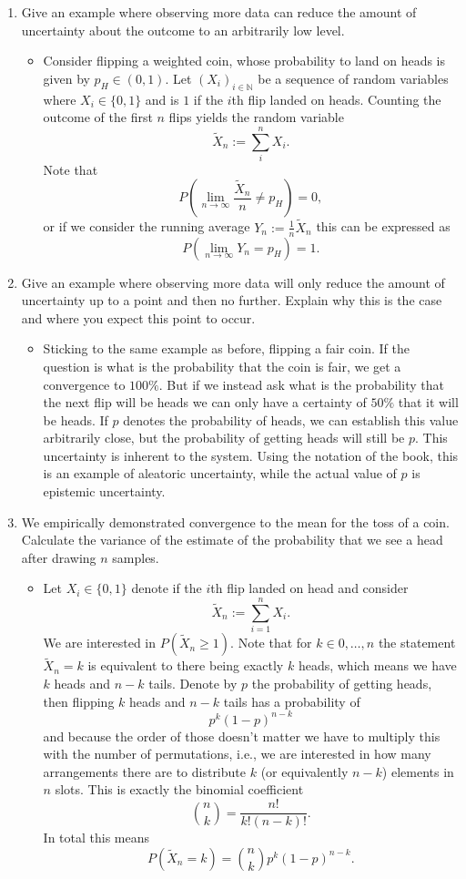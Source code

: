 \documentclass{article}
\begin{document}
\begin{enumerate}
	\item Give an example where observing more data can reduce the amount of uncertainty about the outcome to an arbitrarily low level.
	\begin{itemize}
		\item Consider flipping a weighted coin, whose probability to land on heads is given by $p_H \in (0, 1)$. Let $(X_i)_{i \in \mathbb{N}}$ be a sequence of random variables where $X_i \in \{0, 1\}$ and is $1$ if the $i$th flip landed on heads. Counting the outcome of the first $n$ flips yields the random variable
		$$
		\tilde{X}_n := \sum_{i}^n X_i.
		$$
		Note that
		$$
		P\left(\lim_{n \rightarrow \infty} \frac{\tilde{X}_n}{n} \neq p_H\right) = 0,
		$$
		or if we consider the running average $Y_n := \frac{1}{n} \tilde{X}_n$ this can be expressed as
		$$
		P\left(\lim_{n \rightarrow \infty} Y_n = p_H\right) = 1.
		$$
	\end{itemize}

	\item Give an example where observing more data will only reduce the amount of uncertainty up to a point and then no further. Explain why this is the case and where you expect this point to occur.
	\begin{itemize}
		\item Sticking to the same example as before, flipping a fair coin. If the question is what is the probability that the coin is fair, we get a convergence to $100\%$. But if we instead ask what is the probability that the next flip will be heads we can only have a certainty of $50\%$ that it will be heads. If $p$ denotes the probability of heads, we can establish this value arbitrarily close, but the probability of getting heads will still be $p$. This uncertainty is inherent to the system. Using the notation of the book, this is an example of aleatoric uncertainty, while the actual value of $p$ is epistemic uncertainty.
	\end{itemize}
	\item We empirically demonstrated convergence to the mean for the toss of a coin. Calculate the variance of the estimate of the probability that we see a head after drawing $n$ samples.
		\begin{itemize}
			\item Let $X_i \in \{0, 1\}$ denote if the $i$th flip landed on head and consider 
			$$
			\tilde{X}_n := \sum_{i = 1}^n X_i.
			$$
			We are interested in $P(\tilde{X}_n \geq 1)$. Note that for $k \in {0, \dots, n}$ the statement $\tilde{X}_n = k$ is equivalent to there being exactly $k$ heads, which means we have $k$ heads and $n - k$ tails. Denote by $p$ the probability of getting heads, then flipping $k$ heads and $n - k$ tails has a probability of
			$$
			p^k (1 - p)^{n - k}
			$$
			and because the order of those doesn't matter we have to multiply this with the number of permutations, i.e., we are interested in how many arrangements there are to distribute $k$ (or equivalently $n - k$) elements in $n$ slots. This is exactly the binomial coefficient
			$$
			\binom{n}{k} = \frac{n!}{k! (n - k)!}.
			$$
			In total this means
			$$
			P(\tilde{X}_n = k) = \binom{n}{k} p^k (1 - p)^{n - k}.
			$$


\end{itemize}
\end{enumerate}
\end{document}
